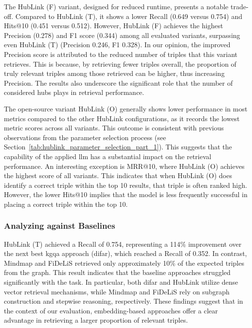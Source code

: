 The HubLink (F) variant, designed for reduced runtime, presents a notable trade-off. Compared to HubLink (T), it shows a lower Recall (0.649 versus 0.754) and Hits@10 (0.451 versus 0.512). However, HubLink (F) achieves the highest Precision (0.278) and F1 score (0.344) among all evaluated variants, surpassing even HubLink (T) (Precision 0.246, F1 0.328). In our opinion, the improved Precision score is attributed to the reduced number of triples that this variant retrieves. This is because, by retrieving fewer triples overall, the proportion of truly relevant triples among those retrieved can be higher, thus increasing Precision. The results also underscore the significant role that the number of considered hubs plays in retrieval performance.

The open-source variant HubLink (O) generally shows lower performance in most metrics compared to the other HubLink configurations, as it records the lowest metric scores across all variants. This outcome is consistent with previous observations from the parameter selection process (see Section~\ref{tab:hublink_parameter_selection_part_1}). This suggests that the capability of the applied \gls{llm} has a substantial impact on the retrieval performance. An interesting exception is MRR@10, where HubLink (O) achieves the highest score of all variants. This indicates that when HubLink (O) does identify a correct triple within the top 10 results, that triple is often ranked high. However, the lower Hits@10 implies that the model is less frequently successful in placing a correct triple within the top 10.


\subsubsection{Analyzing against Baselines}

HubLink (T) achieved a Recall of 0.754, representing a 114\% improvement over the next best \gls{kgqa} approach (\gls{difar}), which reached a Recall of 0.352. In contrast, Mindmap and FiDeLiS retrieved only approximately 10\% of the expected triples from the graph. This result indicates that the baseline approaches struggled significantly with the task. In particular, both \gls{difar} and HubLink utilize dense vector retrieval mechanisms, while Mindmap and FiDeLiS rely on subgraph construction and stepwise reasoning, respectively. These findings suggest that in the context of our evaluation, embedding-based approaches offer a clear advantage in retrieving a larger proportion of relevant triples.

